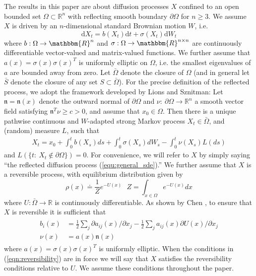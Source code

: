 \documentclass[12pt, nofootinbib,english, amsmath, amssymb, aps, priprint, graphicx,floatfix,draft]{revtex4-1}
\theoremstyle{plain}
\theoremstyle{definition}
\theoremstyle{plain}
\newcommand{\normal}{{\mathfrak{n}}}
\begin{document}
The results in this paper are about diffusion processes $X$ confined to an open bounded set $\Omega \subset \mathbb{R}^n$ with reflecting smooth boundary $\partial\Omega$ for $n\geq 3$.  We assume $X$ is driven by an $n$-dimensional standard Brownian motion $W$, i.e.
\begin{equation}\label{equ:general_sde}\mathrm{d} X_t = b (X_t) \mathrm{d} t + \sigma (X_t) \mathrm{d} W_t \end{equation}
where $b: \Omega \rightarrow \mathbbm{R}^n$ and $\sigma :
\Omega \rightarrow \mathbbm{R}^{n \times n}$ are continuously differentiable vector-valued and matrix-valued functions.  We further assume that $a(x)=\sigma(x)\sigma(x)^T$ is uniformly elliptic on $\Omega$, i.e. the smallest eigenvalues of $a$ are bounded away from zero.  Let $\bar \Omega$ denote the closure of $\Omega$ (and in general let $\bar S$ denote the closure of any set $S\subset \bar \Omega$).  For the precise definition of the reflected process, we adopt the framework developed by Lions and Sznitman\cite{lions1984stochastic}: Let $\normal=\normal(x)$ denote the outward normal of $\partial \Omega$ and $\nu:\ \partial \Omega \rightarrow \mathbb{R}^n$ a smooth vector field satisfying $\normal^T\nu\geq c>0$, and assume that $x_0 \in \Omega$.  Then there is a unique pathwise continuous
and $W$-adapted strong Markov process $X_t\in\bar\Omega$, and (random) measure $L$, such that
\begin{gather}\label{eq:SDER}
X_t = x_0 + \int_0^t b(X_s)ds + \int_0^t \sigma(X_s)dW_s - \int_0^t \nu(X_s) L(ds)
\end{gather}
and $L(\{t:\ X_t \notin \partial \Omega\})=0$.
For convenience, we will refer to $X$ by simply saying ``the reflected diffusion process (\ref{equ:general_sde}).'' We further assume that $X$ is a reversible process, with equilibrium distribution given by
\[
\rho(x)\doteq \frac{1}{Z}e^{-U(x)}\ \ \
Z=\int_{x\in\Omega}e^{-U(x)}dx
\]
where $U:\bar \Omega \rightarrow \mathbb{R}$ is continuously differentiable.  As shown by Chen \cite{chen1993reflecting}, to ensure that $X$ is reversible it is sufficient that
\begin{align}
\begin{split}
b_i(x)&=\frac{1}{2} \sum_j \partial a_{ij}(x)/\partial x_j - \frac{1}{2}\sum_j a_{ij}(x) \partial U(x)/\partial x_j
\label{eqn:reversibility} \\
\nu(x)&= a(x) \normal(x)
\end{split}
\end{align}
where $a(x)=\sigma(x)\sigma(x)^T$ is uniformly elliptic.
When the conditions in (\ref{eqn:reversibility}) are in force
we will say that $X$ satisfies the reversibility conditions relative to $U$.  We assume these conditions throughout the paper.
\end{document}
